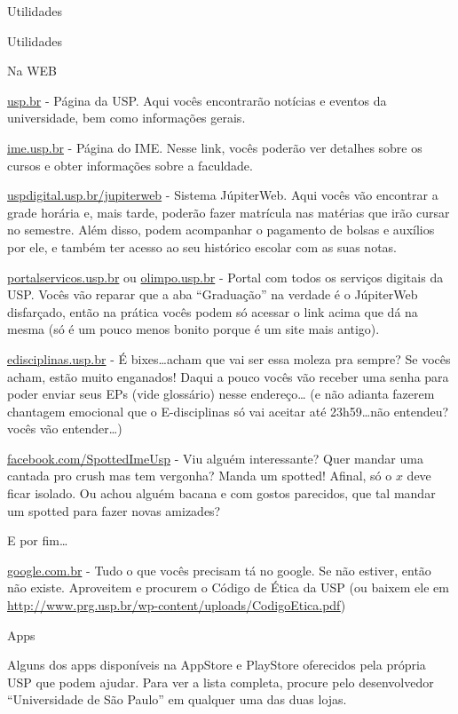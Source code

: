 \begin{secao}{Utilidades}
\begin{secao}{Utilidades}
\begin{subsecao}{Na WEB}

\url{usp.br} - Página da USP. Aqui vocês encontrarão notícias e eventos da
universidade, bem como informações gerais.

\url{ime.usp.br} - Página do IME. Nesse link, vocês poderão ver detalhes sobre
os cursos e obter informações sobre a faculdade.

\url{uspdigital.usp.br/jupiterweb} - Sistema JúpiterWeb. Aqui vocês vão
encontrar a grade horária e, mais tarde, poderão fazer matrícula nas matérias
que irão cursar no semestre. Além disso, podem acompanhar o pagamento de
bolsas e auxílios por ele, e também ter acesso ao seu histórico escolar com
as suas notas.

\url{portalservicos.usp.br} ou \url{olimpo.usp.br} - Portal com todos os
serviços digitais da USP. Vocês vão reparar que a aba ``Graduação'' na verdade
é o JúpiterWeb disfarçado, então na prática vocês podem só acessar o link acima
que dá na mesma (só é um pouco menos bonito porque é um site mais antigo).

\url{edisciplinas.usp.br} - É bixes\dots acham que vai ser essa moleza pra
sempre? Se vocês acham, estão muito enganados! Daqui a pouco vocês vão receber
uma senha para poder enviar seus EPs (vide glossário) nesse endereço\dots
(e não adianta fazerem chantagem emocional que o E-disciplinas só vai aceitar
até 23h59\dots não entendeu? vocês vão entender\dots)

\url{facebook.com/SpottedImeUsp} - Viu alguém interessante? Quer mandar uma
cantada pro crush mas tem vergonha? Manda um spotted! Afinal, só o $x$ deve
ficar isolado. Ou achou alguém bacana e com gostos parecidos, que tal mandar um
spotted para fazer novas amizades?


E por fim\dots

\url{google.com.br} - Tudo o que vocês precisam tá no google. Se não
estiver, então não existe. Aproveitem e procurem o Código de Ética da USP (ou
baixem ele em \url{http://www.prg.usp.br/wp-content/uploads/CodigoEtica.pdf})

\end{subsecao}

\begin{subsecao}{Apps}
	
Alguns dos apps disponíveis na AppStore e PlayStore oferecidos pela própria USP que podem
ajudar. Para ver a lista completa, procure pelo desenvolvedor
``Universidade de São Paulo'' em qualquer uma das duas lojas.


\end{subsecao}
\end{secao}
\end{secao}
